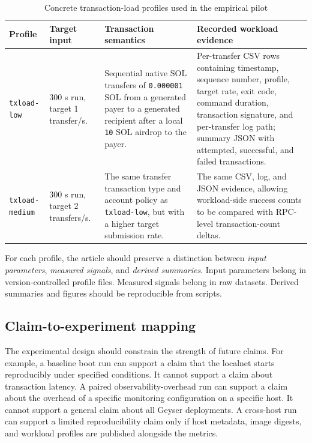 \documentclass[11pt,a4paper]{article}
\begin{document}
\begin{table}[H]
\centering
\small
\caption{Concrete transaction-load profiles used in the empirical pilot}
\label{tab:txload-profile-implementation}
\begin{tabularx}{\textwidth}{L{2.6cm}L{2.9cm}Y Y}
\toprule
\textbf{Profile} & \textbf{Target input} & \textbf{Transaction semantics} & \textbf{Recorded workload evidence} \\
\midrule
\texttt{txload-low} & 300 s run, target 1 transfer/s. & Sequential native SOL transfers of \texttt{0.000001} SOL from a generated payer to a generated recipient after a local \texttt{10} SOL airdrop to the payer. & Per-transfer CSV rows containing timestamp, sequence number, profile, target rate, exit code, command duration, transaction signature, and per-transfer log path; summary JSON with attempted, successful, and failed transactions. \\
\texttt{txload-medium} & 300 s run, target 2 transfers/s. & The same transfer transaction type and account policy as \texttt{txload-low}, but with a higher target submission rate. & The same CSV, log, and JSON evidence, allowing workload-side success counts to be compared with RPC-level transaction-count deltas. \\
\bottomrule
\end{tabularx}
\end{table}

For each profile, the article should preserve a distinction between \emph{input parameters}, \emph{measured signals}, and \emph{derived summaries}. Input parameters belong in version-controlled profile files. Measured signals belong in raw datasets. Derived summaries and figures should be reproducible from scripts.

\subsection{Claim-to-experiment mapping}
\label{subsec:claim-experiment-mapping}

The experimental design should constrain the strength of future claims. For example, a baseline boot run can support a claim that the localnet starts reproducibly under specified conditions. It cannot support a claim about transaction latency. A paired observability-overhead run can support a claim about the overhead of a specific monitoring configuration on a specific host. It cannot support a general claim about all Geyser deployments. A cross-host run can support a limited reproducibility claim only if host metadata, image digests, and workload profiles are published alongside the metrics.
\end{document}
